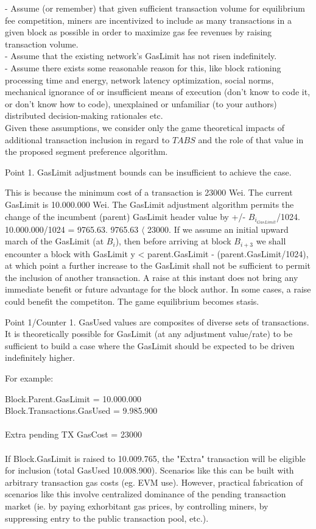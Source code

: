 \documentclass[11pt]{article}
\theoremstyle{plain}
\begin{document}
{- Assume (or remember) that given sufficient transaction volume for equilibrium
fee competition, miners
  are incentivized to include as many transactions in a given block as possible
in order to maximize
  gas fee revenues by raising transaction volume. \\
- Assume that the existing network's GasLimit has not risen indefinitely. \\
- Assume there exists some reasonable reason for this, like block rationing
processing time and energy,
  network latency optimization, social norms, mechanical ignorance of or
insufficient means of execution (don't know to code it, or don't know how to
code),
  unexplained or unfamiliar (to your authors) distributed decision-making
rationales etc. \\

Given these assumptions, we consider only the game theoretical impacts of
additional transaction inclusion
in regard to $TABS$ and the role of that value in the proposed segment
preference algorithm.

Point 1. GasLimit adjustment bounds can be insufficient to achieve the case.

This is because the minimum cost of a transaction is 23000 Wei.
The current GasLimit is 10.000.000 Wei.
The GasLimit adjustment algorithm permits the change of the incumbent (parent)
GasLimit header value by +/- $B_{i}_{GasLimit}$/1024.
10.000.000/1024 = 9765.63.
9765.63 $\langle$ 23000.
If we assume an initial upward march of the GasLimit (at $B_{i}$), then before
arriving at block $B_{i+3}$ we shall encounter a
block with GasLimit y < parent.GasLimit - (parent.GasLimit/1024), at which
point a further increase to the GasLimit
shall not be sufficient to permit the inclusion of another transaction.
A raise at this instant does not bring any immediate benefit or future
advantage for the block author. In some cases, a raise could benefit the
competiton.
The game equilibrium becomes stasis.

Point 1/Counter 1. GasUsed values are composites of diverse sets of
transactions. It is theoretically possible for GasLimit (at any adjustment
value/rate) to be sufficient to build a case where
the GasLimit should be expected to be driven indefinitely higher. 

For example:

Block.Parent.GasLimit     = 10.000.000 \\
Block.Transactions.GasUsed = 9.985.900 \\
\\
Extra pending TX GasCost = 23000 \\
\\
If Block.GasLimit is raised to 10.009.765, the "Extra" transaction will be
eligible for inclusion (total GasUsed 10.008.900).
Scenarios like this can be built with arbitrary transaction gas costs (eg. EVM
use).
However, practical fabrication of scenarios like this involve centralized
dominance of the pending transaction market (ie. by paying exhorbitant gas
prices, by controlling miners, by suppressing entry to the public transaction
pool, etc.).

}
\end{document}
